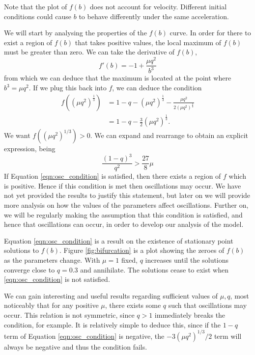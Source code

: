 \documentclass{report}
\begin{document}
Note that the plot of $f(b)$ does not account for velocity.
Different initial conditions could cause $b$ to behave differently under the same acceleration.

We will start by analysing the properties of the $f(b)$ curve.
In order for there to exist a region of $f(b)$ that takes positive values,
the local maximum of $f(b)$ must be greater than zero.
We can take the derivative of $f(b)$,
\begin{equation}
    f'(b) = -1 + \frac{\mu q^2}{b^3}
\end{equation}
from which we can deduce that the maximum is located at the point where $b^3 = \mu q^2$.
If we plug this back into $f$, we can deduce the condition
\begin{align}
    f((\mu q^2)^{\frac{1}{3}}) & = 1 - q - (\mu q^2)^{\frac{1}{3}} - \frac{\mu q^2}{2(\mu q^2)^{\frac{2}{3}}} \\
                               & = 1 - q - \frac{3}{2}(\mu q^2)^{\frac{1}{3}}.
\end{align}
We want \(f((\mu q^2)^{1/3}) > 0 \). We can expand and rearrange to obtain an explicit expression, being
\begin{equation}
    \frac{(1-q)^3}{q^2} > \frac{27}{8}\mu
    \label{eqn:osc_condition}
\end{equation}
If Equation \ref{eqn:osc_condition} is satisfied,
then there exists a region of $f$ which is positive.
Hence if this condition is met then oscillations may occur. %
We have not yet provided the results to justify this statement, but later on we will provide more analysis on how the values of the parameters affect oscillations.
Further on, we will be regularly making the assumption that this condition is satisfied,
and hence that oscillations can occur,
in order to develop our analysis of the model.

Equation \ref{eqn:osc_condition} is a result on the existence of stationary point solutions to $f(b)$.
Figure \ref{fig:bifurcation} is a plot showing the zeroes of $f(b)$ as the parameters change.
With $\mu=1$ fixed, $q$ increases until the solutions converge close to $q=0.3$ and annihilate. %
The solutions cease to exist when \ref{eqn:osc_condition} is not satisfied.

We can gain interesting and useful results regarding sufficient values of $\mu, q$,
most noticeably that for any positive $\mu$, there exists some $q$ such that oscillations may occur.
This relation is not symmetric, since $q>1$ immediately breaks the condition, for example.
It is relatively simple to deduce this, since if the $1-q$ term of Equation \ref{eqn:osc_condition} is negative,
the $-3(\mu q^2)^{1/3}/2$ term will always be negative and thus the condition fails.
\end{document}
